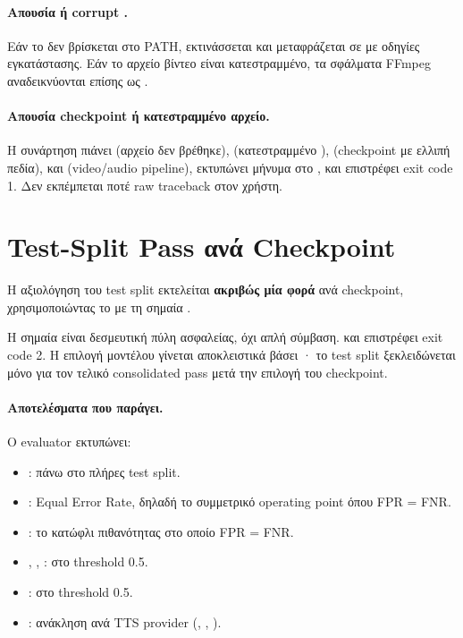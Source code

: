 \paragraph{Απουσία  ή corrupt .}
Εάν το  δεν βρίσκεται στο PATH,
εκτινάσσεται  και μεταφράζεται σε
 με οδηγίες εγκατάστασης.
Εάν το αρχείο βίντεο είναι κατεστραμμένο,
τα σφάλματα FFmpeg αναδεικνύονται επίσης ως .

\paragraph{Απουσία checkpoint ή κατεστραμμένο αρχείο.}
Η συνάρτηση  πιάνει
 (αρχείο δεν βρέθηκε),
 (κατεστραμμένο ),
 (checkpoint με ελλιπή πεδία), και
 (video/audio pipeline),
εκτυπώνει μήνυμα στο , και επιστρέφει exit code 1.
Δεν εκπέμπεται ποτέ raw traceback στον χρήστη.

\section{Test-Split Pass ανά Checkpoint}
\label{sec:test-pass}

Η αξιολόγηση του test split εκτελείται \textbf{ακριβώς μία φορά}
ανά checkpoint, χρησιμοποιώντας το 
με τη σημαία .

Η σημαία  είναι δεσμευτική πύλη ασφαλείας,
όχι απλή σύμβαση.
και επιστρέφει exit code 2.
Η επιλογή μοντέλου γίνεται αποκλειστικά βάσει ·
το test split ξεκλειδώνεται μόνο για τον τελικό consolidated pass
μετά την επιλογή του checkpoint.

\paragraph{Αποτελέσματα που παράγει.}
Ο evaluator εκτυπώνει:

\begin{itemize}
  \item {}: \AUC{} πάνω στο πλήρες test split.
  \item {}: Equal Error Rate, δηλαδή το συμμετρικό operating point
        όπου FPR = FNR.
  \item {}: το κατώφλι πιθανότητας στο οποίο FPR = FNR.
  \item {}, , : στο threshold 0.5.
  \item {}:  στο threshold 0.5.
  \item {}: ανάκληση ανά TTS provider
        (, , ).
\end{itemize}

